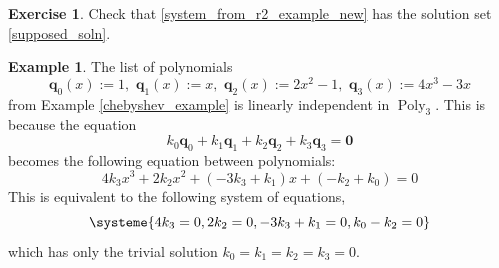 \documentclass[a4paper,11pt]{book}
\theoremstyle{definition}
\newtheorem{exercise}{Exercise}
\newtheorem{example_environment}{Example}[chapter]
\newcommand{\ve}[1]{\mathbf{#1}}
\newenvironment{example}
	{
		\begin{oframed} 
		\begin{example_environment}
	}
	{
		\end{example_environment}
		\end{oframed}
	}
\DeclareMathOperator{\Poly}{Poly}
\begin{document}
\begin{exercise} Check that \eqref{system_from_r2_example_new} has the solution set \eqref{supposed_soln}.
\end{exercise}

\begin{example} The list of polynomials  \label{new_basis_for_poly_3}
\[
\ve{q}_0(x) := 1, \,\, \ve{q}_1(x) := x, \,\, \ve{q}_2(x) := 2x^2 - 1, \,\, \ve{q}_3(x) := 4x^3 - 3x
\]
from Example \ref{chebyshev_example} is linearly independent in $\Poly_3$. This is because the equation
\[
k_0 \ve{q}_0 + k_1 \ve{q}_1 + k_2 \ve{q}_2 + k_3 \ve{q}_3 = \ve{0}
\]	
becomes the following equation between polynomials:
\[
 4k_3 x^3 + 2k_2 x^2 + (-3k_3 + k_1) x + (-k_2 + k_0) = 0
\]
This is equivalent to the following system of equations,
\[
 \systeme{ 4k_3 = 0, 2k_2 = 0, -3 k_3 + k_1 = 0 , k_0 - k_2 = 0}
\]
which has only the trivial solution $k_0 = k_1 = k_2 = k_3 = 0$.
\end{example}
\end{document}
